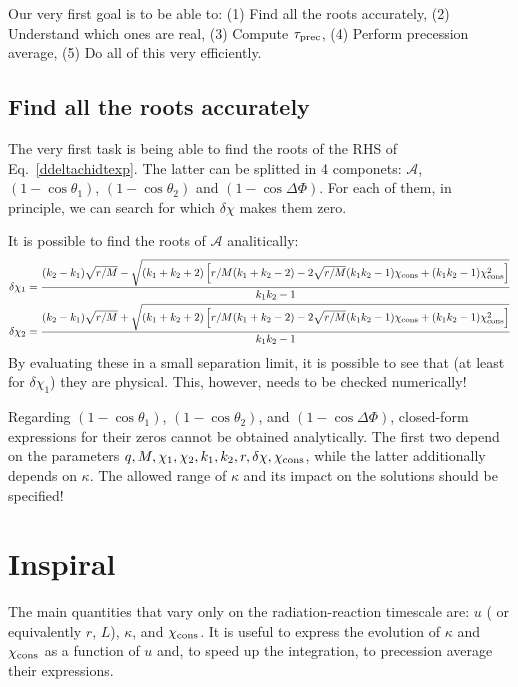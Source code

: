 \documentclass[floats,floatfix,showpacs,amssymb,prd,twocolumn,superscriptaddress,nofootinbib,nolongbibliography,reprint,onecolumn]{revtex4-2}
\newcommand{\deltachi}{\delta \chi}
\newcommand{\chicons}{\chi_{\rm cons}}
\begin{document}
Our very first goal is to be able to: (1) Find all the roots accurately, (2) Understand which ones are real, (3) Compute $\tau_{\rm prec}$, (4) Perform precession average, (5) Do all of this very efficiently.

\subsection{Find all the roots accurately}
 The very first task is being able to find the roots of the RHS of Eq.~\eqref{ddeltachidtexp}. The latter can be splitted in 4 componets: $\mathcal{A}$, $(1-\cos\theta_1)$, $(1-\cos\theta_2)$ and $(1-\cos\Delta\Phi)$. For each of them, in principle, we can search for which $\deltachi$ makes them zero.

 It is possible to find the roots of $\mathcal{A}$ analitically:
   \begin{align}
 \delta\chi_{1}&=\frac{(k_2-k_1) \sqrt{r/M}-\sqrt{ (k_1+k_2+2) \left[r /M(k_1+k_2-2)-2  \sqrt{r/M}  (k_1 k_2-1)\chicons+  (k_1 k_2-1)\chicons^2\right]}}{ k_1 k_2-1}\\
  \delta\chi_{2}&=\frac{(k_2-k_1)  \sqrt{r/M}+\sqrt{(k_1+k_2+2) \left[r/M (k_1+k_2-2)-2  \sqrt{r/M}  (k_1 k_2-1)\chicons+  (k_1 k_2-1)\chicons^2\right]}}{ k_1 k_2-1}\\
 \end{align}
By evaluating these in a small separation limit, it is possible to see that (at least for $ \delta\chi_{1}$) they are physical. This, however, needs to be checked numerically!

Regarding $(1 - \cos\theta_1)$, $(1 - \cos\theta_2)$, and $(1 - \cos\Delta\Phi)$, closed-form expressions for their zeros cannot be obtained analytically. The first two depend on the parameters ${q, M, \chi_1, \chi_2, k_1, k_2, r, \delta\chi, \chicons}$, while the latter additionally depends on $\kappa$. The allowed range of $\kappa$ and its impact on the solutions should be specified!
\section{Inspiral}


 The main quantities that vary only on the radiation-reaction timescale are: $u$ ( or equivalently $r$, $L$), $\kappa$, and $\chicons$. 
 It is useful to express the evolution of $\kappa$ and $\chicons$ as a function of $u$ and, to speed up the integration, to precession average their expressions. 
 
\end{document}
